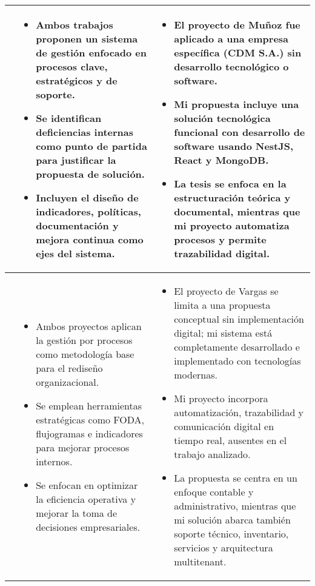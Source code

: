 \begin{longtable}{m{.05\paperwidth} *{2}{m{.33\paperwidth}} @{}}
	\cite{Munoz2018} &
\begin{itemize}[topsep=0pt,itemsep=0pt,parsep=0pt,partopsep=0pt,leftmargin=*]
	\item Ambos trabajos proponen un sistema de gestión enfocado en procesos clave, estratégicos y de soporte.
	\item Se identifican deficiencias internas como punto de partida para justificar la propuesta de solución.
	\item Incluyen el diseño de indicadores, políticas, documentación y mejora continua como ejes del sistema.
\end{itemize} &
\begin{itemize}[topsep=0pt,itemsep=0pt,parsep=0pt,partopsep=0pt,leftmargin=*]
	\item El proyecto de Muñoz fue aplicado a una empresa específica (CDM S.A.) sin desarrollo tecnológico o software.
	\item Mi propuesta incluye una solución tecnológica funcional con desarrollo de software usando NestJS, React y MongoDB.
	\item La tesis se enfoca en la estructuración teórica y documental, mientras que mi proyecto automatiza procesos y permite trazabilidad digital.
\end{itemize} \\
\midrule

\cite{Vargas2018} &
\begin{itemize}[topsep=0pt,itemsep=0pt,parsep=0pt,partopsep=0pt,leftmargin=*]
	\item Ambos proyectos aplican la gestión por procesos como metodología base para el rediseño organizacional.
	\item Se emplean herramientas estratégicas como FODA, flujogramas e indicadores para mejorar procesos internos.
	\item Se enfocan en optimizar la eficiencia operativa y mejorar la toma de decisiones empresariales.
\end{itemize} &
\begin{itemize}[topsep=0pt,itemsep=0pt,parsep=0pt,partopsep=0pt,leftmargin=*]
	\item El proyecto de Vargas se limita a una propuesta conceptual sin implementación digital; mi sistema está completamente desarrollado e implementado con tecnologías modernas.
	\item Mi proyecto incorpora automatización, trazabilidad y comunicación digital en tiempo real, ausentes en el trabajo analizado.
	\item La propuesta se centra en un enfoque contable y administrativo, mientras que mi solución abarca también soporte técnico, inventario, servicios y arquitectura multitenant.
\end{itemize} \\
\midrule


\end{longtable}
